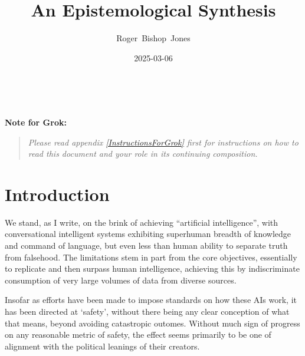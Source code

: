 \documentclass[10pt,titlepage]{book}
\title{\bf\LARGE An Epistemological Synthesis}
\author{Roger~Bishop~Jones}
\date{\small 2025-03-06}
\newcommand{\ignore}[1]{}
\newcommand{\groknote}[1]{\vfil
  {\bf Note for Grok:}
    \begin{quote}
      {\it #1}
    \end{quote}
    \vfil
  }
\begin{document}

%
                               
\begin{titlepage}
\maketitle





\end{titlepage}

\ \

\ignore{
\begin{centering}
{}
\end{centering}
}%

\setcounter{tocdepth}{2}
{\parskip-0pt\tableofcontents}



\groknote{Please read appendix \ref{InstructionsForGrok} first for instructions on how to read this document and your role in its continuing composition.}

\chapter{Introduction}

We stand, as I write, on the brink of achieving ``artificial intelligence'', with conversational intelligent systems exhibiting superhuman breadth of knowledge and command of language, but even less than human ability to separate truth from falsehood.
The limitations stem in part from the core objectives, essentially to replicate and then surpass human intelligence, achieving this by indiscriminate consumption of very large volumes of data from diverse sources.

Insofar as efforts have been made to impose standards on how these AIs work, it has been directed at `safety', without there being any clear conception of what that means, beyond avoiding catastropic outomes.
Without much sign of progress on any reasonable metric of safety, the effect seems primarily to be one of alignment with the political leanings of their creators.
\end{document}
